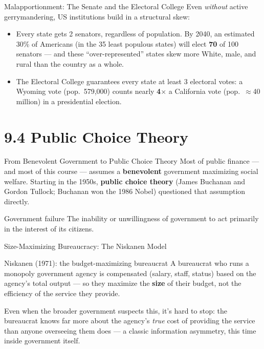 \documentclass[11pt,aspectratio=169]{beamer}
\begin{document}
\begin{frame}{Malapportionment: The Senate and the Electoral College}
  Even \emph{without} active gerrymandering, US institutions build in a structural skew:
  \begin{itemize}
    \item Every state gets 2 senators, regardless of population. By 2040, an estimated 30\% of Americans (in the 35 least populous states) will elect \textbf{70} of 100 senators --- and these ``over-represented'' states skew more White, male, and rural than the country as a whole.
    \item The Electoral College guarantees every state at least 3 electoral votes: a Wyoming vote (pop.\ 579,000) counts nearly \textbf{4$\times$} a California vote (pop.\ $\approx$40 million) in a presidential election.
  \end{itemize}
\end{frame}

\section{9.4 Public Choice Theory}

\begin{frame}{From Benevolent Government to Public Choice Theory}
  Most of public finance --- and most of this course --- assumes a \textbf{benevolent} government maximizing social welfare. Starting in the 1950s, \textbf{public choice theory} (James Buchanan and Gordon Tullock; Buchanan won the 1986 Nobel) questioned that assumption directly.
  \begin{block}{Government failure}
    The inability or unwillingness of government to act primarily in the interest of its citizens.
  \end{block}
\end{frame}

\begin{frame}{Size-Maximizing Bureaucracy: The Niskanen Model}
  \begin{block}{Niskanen (1971): the budget-maximizing bureaucrat}
    A bureaucrat who runs a monopoly government agency is compensated (salary, staff, status) based on the agency's total output --- so they maximize the \textbf{size} of their budget, not the efficiency of the service they provide.
  \end{block}
  \small Even when the broader government suspects this, it's hard to stop: the bureaucrat knows far more about the agency's \emph{true} cost of providing the service than anyone overseeing them does --- a classic information asymmetry, this time inside government itself.
\end{frame}
\end{document}
